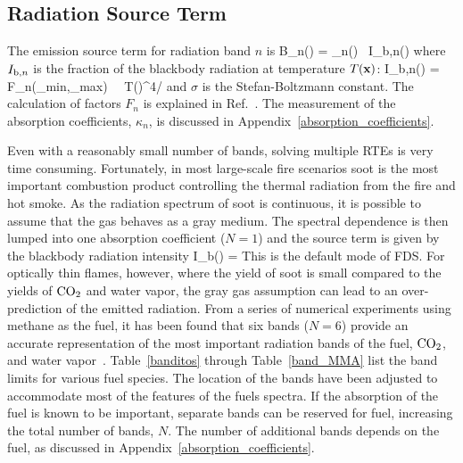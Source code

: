 \subsection{Radiation Source Term}

The emission source term for radiation band $n$ is
\be
   B_n(\bx) = \kappa_n(\bx) \, I_{{\rm b},n}(\bx)
\ee
where $I_{{\rm b},n}$ is the fraction of the blackbody radiation at temperature $T({\mathbf{x}})$:
\be
   I_{{\rm b},n}(\bx) = F_n(\la_{\rm min},\la_{\rm max}) \, \sigma \, T(\bx)^4/\pi
\ee
and $\sigma$ is the Stefan-Boltzmann constant. The calculation of factors $F_n$ is explained in Ref.~\cite{Siegel:1}. The measurement of the absorption coefficients, $\kappa_n$, is discussed in Appendix~\ref{absorption_coefficients}.

Even with a reasonably small number of bands, solving multiple RTEs is very time consuming. Fortunately, in most large-scale fire scenarios soot is the most important combustion product controlling the thermal radiation from the fire and hot smoke. As the radiation spectrum of soot is continuous, it is possible to assume that the gas behaves as a gray medium.  The spectral dependence is then lumped into one absorption coefficient ($N=1$) and the source term is given by the blackbody radiation intensity \cite{Ludwig:NASA}
\be
   I_{\rm b}(\bx) =  \label{emission_source_term}
\ee
This is the default mode of FDS. For optically thin flames, however, where the yield of soot is small compared to the yields of $\rm CO_2$ and water vapor, the gray gas assumption can lead to an over-prediction of the emitted radiation. From a series of numerical experiments using methane as the fuel, it has been found that six bands ($N=6$) provide an accurate representation of the most important radiation bands of the fuel, $\rm CO_2$, and water vapor~\cite{Hostikka:3}. Table~\ref{banditos} through Table~\ref{band_MMA} list the band limits for various fuel species. The location of the bands have been adjusted to accommodate most of the features of the fuels spectra. If the absorption of the fuel is known to be important, separate bands can be reserved for fuel, increasing the total number of bands, $N$. The number of additional bands depends on the fuel, as discussed in Appendix~\ref{absorption_coefficients}.

